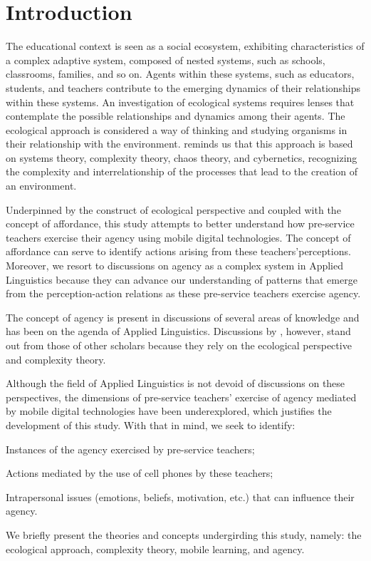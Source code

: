 \section{Introduction}\label{sec-intro}
The educational context is seen as a social ecosystem, exhibiting characteristics of a complex adaptive system, composed of nested systems, such as schools, classrooms, families, and so on. Agents within these systems, such as educators, students, and teachers contribute to the emerging dynamics of their relationships within these systems. An investigation of ecological systems requires lenses that contemplate the possible relationships and dynamics among their agents. The ecological approach is considered a way of thinking and studying organisms in their relationship with the environment. \textcite{vanlier2004} reminds us that this approach is based on systems theory, complexity theory, chaos theory, and cybernetics, recognizing the complexity and interrelationship of the processes that lead to the creation of an environment.


Underpinned by the construct of ecological perspective and coupled with the concept of affordance, this study attempts to better understand how pre-service teachers exercise their agency using mobile digital technologies. The concept of affordance can serve to identify actions arising from these teachers’perceptions. Moreover, we resort to discussions on agency as a complex system in Applied Linguistics \cite{mercer2012, larsen2019} because they can advance our understanding of patterns that emerge from the perception-action relations as these pre-service teachers exercise agency.


The concept of agency is present in discussions of several areas of knowledge and has been on the agenda of Applied Linguistics. Discussions by \textcite{vanlier2004,vanlier2010a,mercer2011,mercer2012,mercer2018,larsen2019}, however, stand out from those of other scholars because they rely on the ecological perspective and complexity theory.


Although the field of Applied Linguistics is not devoid of discussions on these perspectives, the dimensions of pre-service teachers’ exercise of agency mediated by mobile digital technologies have been underexplored, which justifies the development of this study. With that in mind, we seek to identify: 

\begin{enumerate*}[label=\roman*)]
	\item Instances of the agency exercised by pre-service teachers;
	\item Actions mediated by the use of cell phones by these teachers;
	\item Intrapersonal issues (emotions, beliefs, motivation, etc.) that can influence their agency.
\end{enumerate*}


We briefly present the theories and concepts undergirding this study, namely: the ecological approach, complexity theory, mobile learning, and agency.

